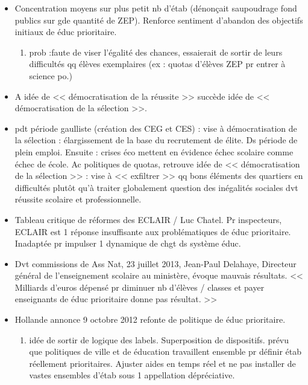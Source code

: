 \documentclass[12pt]{report}
\begin{document}
\begin{itemize}
\begin{enumerate}
\end{enumerate}

\item  Concentration moyens sur plus petit nb d'étab (dénonçait saupoudrage fond publics sur gde quantité de ZEP). Renforce sentiment d'abandon des objectifs initiaux de éduc prioritaire. \\
\begin{enumerate}
\item prob :faute de viser l'égalité des chances, essaierait de sortir de leurs difficultés qq élèves exemplaires (ex : quotas d'élèves ZEP pr entrer à science po.) \\
\end{enumerate}

\item  A idée de << démocratisation de la réussite >> succède idée de << démocratisation de la sélection >>. \\

\item pdt période gaulliste (création des CEG et CES) : vise à démocratisation de la sélection : élargissement  de la base du recrutement de élite. Ds période de plein emploi. Ensuite : crises éco mettent en évidence échec scolaire comme échec de école. Ac politiques de quotas, retrouve idée de << démocratisation de la sélection >> : vise à << exfiltrer >> qq bons éléments des quartiers en difficultés plutôt qu'à traiter globalement question des inégalités sociales dvt réussite scolaire et professionnelle. \\

\item Tableau critique de réformes des ECLAIR / Luc Chatel. Pr inspecteurs, ECLAIR est 1 réponse insuffisante aux problématiques de éduc prioritaire. Inadaptée pr impulser 1 dynamique de chgt ds système éduc. \\

\item Dvt commissions de Ass Nat, 23 juillet 2013, Jean-Paul Delahaye, Directeur général de l'enseignement scolaire au ministère, évoque mauvais résultats. << Milliards d'euros dépensé pr diminuer nb d'élèves / classes et payer enseignants de éduc prioritaire donne pas résultat. >> \\

\item  Hollande annonce 9 octobre 2012 refonte de politique de éduc prioritaire.
\begin{enumerate}
\item idée de sortir de logique des labels. Superposition de dispositifs. prévu que politiques de ville et de éducation travaillent ensemble pr définir étab réellement prioritaires. Ajuster aides en temps réel et ne  pas installer de vastes ensembles d'étab sous 1 appellation dépréciative. \\
\end{enumerate}







\end{itemize}
\end{document}
